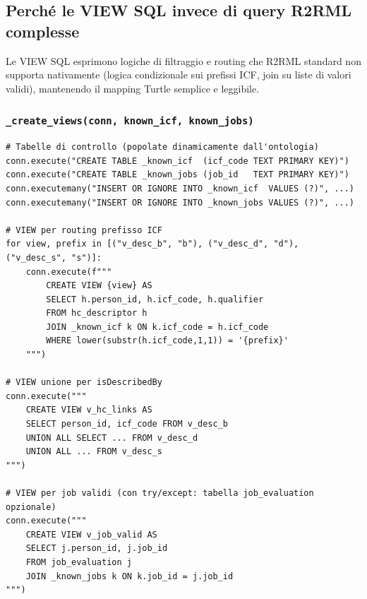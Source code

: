 \documentclass[a4paper,12pt]{article}
\begin{document}
\subsection{Perch\'{e} le VIEW SQL invece di query R2RML complesse}
\label{sec:views}

\begin{infobox}
Le VIEW SQL esprimono logiche di filtraggio e routing che R2RML standard
non supporta nativamente (logica condizionale sui prefissi ICF, join su
liste di valori validi), mantenendo il mapping Turtle semplice e leggibile.
\end{infobox}

\subsubsection{\texttt{\_\allowbreak{}create\_\allowbreak{}views(conn, known\_\allowbreak{}icf, known\_\allowbreak{}jobs)}}

\begin{lstlisting}[caption={Creazione delle VIEW ausiliarie nel DB SQLite in-memory.}]
# Tabelle di controllo (popolate dinamicamente dall'ontologia)
conn.execute("CREATE TABLE _known_icf  (icf_code TEXT PRIMARY KEY)")
conn.execute("CREATE TABLE _known_jobs (job_id   TEXT PRIMARY KEY)")
conn.executemany("INSERT OR IGNORE INTO _known_icf  VALUES (?)", ...)
conn.executemany("INSERT OR IGNORE INTO _known_jobs VALUES (?)", ...)

# VIEW per routing prefisso ICF
for view, prefix in [("v_desc_b", "b"), ("v_desc_d", "d"), ("v_desc_s", "s")]:
    conn.execute(f"""
        CREATE VIEW {view} AS
        SELECT h.person_id, h.icf_code, h.qualifier
        FROM hc_descriptor h
        JOIN _known_icf k ON k.icf_code = h.icf_code
        WHERE lower(substr(h.icf_code,1,1)) = '{prefix}'
    """)

# VIEW unione per isDescribedBy
conn.execute("""
    CREATE VIEW v_hc_links AS
    SELECT person_id, icf_code FROM v_desc_b
    UNION ALL SELECT ... FROM v_desc_d
    UNION ALL ... FROM v_desc_s
""")

# VIEW per job validi (con try/except: tabella job_evaluation opzionale)
conn.execute("""
    CREATE VIEW v_job_valid AS
    SELECT j.person_id, j.job_id
    FROM job_evaluation j
    JOIN _known_jobs k ON k.job_id = j.job_id
""")
\end{lstlisting}
\end{document}
